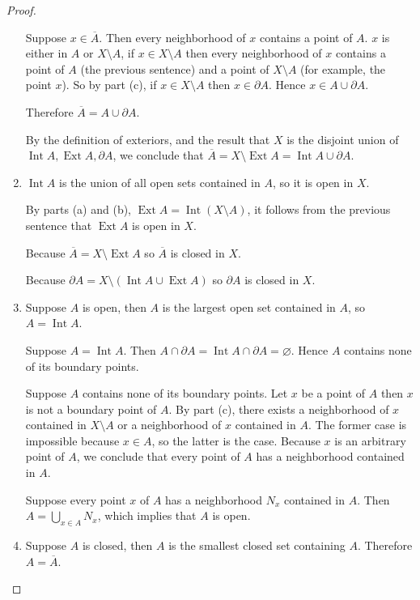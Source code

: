 \begin{proof}
\begin{enumerate}[label={(\alph*)}]
		      Suppose $x\in\overline{A}$. Then every neighborhood of $x$ contains a point of $A$. $x$ is either in $A$ or $X\setminus A$, if $x\in X\setminus A$ then every neighborhood of $x$ contains a point of $A$ (the previous sentence) and a point of $X\setminus A$ (for example, the point $x$). So by part (c), if $x\in X\setminus A$ then $x\in\partial A$. Hence $x\in A\cup\partial A$.

		      Therefore $\overline{A} = A\cup\partial A$.

		      By the definition of exteriors, and the result that $X$ is the disjoint union of $\operatorname{Int}A, \operatorname{Ext}A, \partial A$, we conclude that $\overline{A} = X\setminus \operatorname{Ext} A = \operatorname{Int} A\cup \partial A$.

		\item $\operatorname{Int} A$ is the union of all open sets contained in $A$, so it is open in $X$.

		      By parts (a) and (b), $\operatorname{Ext} A = \operatorname{Int} (X\setminus A)$, it follows from the previous sentence that $\operatorname{Ext} A$ is open in $X$.

		      Because $\overline{A} = X\setminus\operatorname{Ext} A$ so $\overline{A}$ is closed in $X$.

		      Because $\partial A = X\setminus (\operatorname{Int} A \cup \operatorname{Ext} A)$ so $\partial A$ is closed in $X$.

		\item Suppose $A$ is open, then $A$ is the largest open set contained in $A$, so $A = \operatorname{Int} A$.

		      Suppose $A = \operatorname{Int} A$. Then $A\cap \partial A = \operatorname{Int} A \cap \partial A = \varnothing$. Hence $A$ contains none of its boundary points.

		      Suppose $A$ contains none of its boundary points. Let $x$ be a point of $A$ then $x$ is not a boundary point of $A$. By part (c), there exists a neighborhood of $x$ contained in $X\setminus A$ or a neighborhood of $x$ contained in $A$. The former case is impossible because $x\in A$, so the latter is the case. Because $x$ is an arbitrary point of $A$, we conclude that every point of $A$ has a neighborhood contained in $A$.

		      Suppose every point $x$ of $A$ has a neighborhood $N_{x}$ contained in $A$. Then $A = \bigcup_{x\in A}N_{x}$, which implies that $A$ is open.

		\item Suppose $A$ is closed, then $A$ is the smallest closed set containing $A$. Therefore $A = \overline{A}$.


\end{enumerate}
\end{proof}
